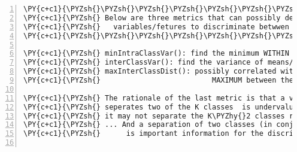 \begin{Verbatim}[commandchars=\\\{\},codes={\catcode`\$=3\catcode`\^=7\catcode`\_=8},gobble=0,numbers=left,fontfamily=fvm,fontshape=n,fontsize=\footnotesize,tabsize=2]
\PY{c+c1}{\PYZsh{}\PYZsh{}\PYZsh{}\PYZsh{}\PYZsh{}\PYZsh{}\PYZsh{}\PYZsh{}\PYZsh{}\PYZsh{}\PYZsh{}\PYZsh{}\PYZsh{}\PYZsh{}\PYZsh{}\PYZsh{}\PYZsh{}\PYZsh{}\PYZsh{}\PYZsh{}\PYZsh{}\PYZsh{}\PYZsh{}\PYZsh{}\PYZsh{}\PYZsh{}\PYZsh{}\PYZsh{}\PYZsh{}\PYZsh{}\PYZsh{}\PYZsh{}\PYZsh{}\PYZsh{}\PYZsh{}\PYZsh{}\PYZsh{}\PYZsh{}\PYZsh{}\PYZsh{}\PYZsh{}\PYZsh{}\PYZsh{}\PYZsh{}\PYZsh{}\PYZsh{}\PYZsh{}\PYZsh{}\PYZsh{}\PYZsh{}\PYZsh{}\PYZsh{}\PYZsh{}\PYZsh{}\PYZsh{}\PYZsh{}\PYZsh{}\PYZsh{}\PYZsh{}\PYZsh{}\PYZsh{}\PYZsh{}\PYZsh{}\PYZsh{}\PYZsh{}\PYZsh{}\PYZsh{}\PYZsh{}\PYZsh{}\PYZsh{}\PYZsh{}\PYZsh{}\PYZsh{}\PYZsh{}\PYZsh{}}
\PY{c+c1}{\PYZsh{} Below are three metrics that can possibly describe the value of      }
\PY{c+c1}{\PYZsh{}   variables/fetures to discriminate betwwen classes                                                             \PYZsh{}\PYZsh{}\PYZsh{}\PYZsh{}}
\PY{c+c1}{\PYZsh{}\PYZsh{}\PYZsh{}\PYZsh{}\PYZsh{}\PYZsh{}\PYZsh{}\PYZsh{}\PYZsh{}\PYZsh{}\PYZsh{}\PYZsh{}\PYZsh{}\PYZsh{}\PYZsh{}\PYZsh{}\PYZsh{}\PYZsh{}\PYZsh{}\PYZsh{}\PYZsh{}\PYZsh{}\PYZsh{}\PYZsh{}\PYZsh{}\PYZsh{}\PYZsh{}\PYZsh{}\PYZsh{}\PYZsh{}\PYZsh{}\PYZsh{}\PYZsh{}\PYZsh{}\PYZsh{}\PYZsh{}\PYZsh{}\PYZsh{}\PYZsh{}\PYZsh{}\PYZsh{}\PYZsh{}\PYZsh{}\PYZsh{}\PYZsh{}\PYZsh{}\PYZsh{}\PYZsh{}\PYZsh{}\PYZsh{}\PYZsh{}\PYZsh{}\PYZsh{}\PYZsh{}\PYZsh{}\PYZsh{}\PYZsh{}\PYZsh{}\PYZsh{}\PYZsh{}\PYZsh{}\PYZsh{}\PYZsh{}\PYZsh{}\PYZsh{}\PYZsh{}\PYZsh{}\PYZsh{}\PYZsh{}\PYZsh{}\PYZsh{}\PYZsh{}\PYZsh{}\PYZsh{}\PYZsh{}}

\PY{c+c1}{\PYZsh{} minIntraClassVar(): find the minimum WITHIN class variance of the K groups}
\PY{c+c1}{\PYZsh{} interClassVar(): find the variance of means/centroids of the K groups}
\PY{c+c1}{\PYZsh{} maxInterClassDist(): possibly correlated with interClassVar, find the dist }
\PY{c+c1}{\PYZsh{}							MAXIMUM between the K group\PYZsq{}s centroids/means}
                         
\PY{c+c1}{\PYZsh{} The rationale of the last metric is that a variable/feature that only }
\PY{c+c1}{\PYZsh{} seperates two of the K classes  is undervalued by the Fisher score because }
\PY{c+c1}{\PYZsh{} it may not separate the K\PYZhy{}2 classes remaining well.	}
\PY{c+c1}{\PYZsh{} ... And a separation of two classes (in conjunction with other variables) }
\PY{c+c1}{\PYZsh{}      is important information for the discriminant model}


\end{Verbatim}
